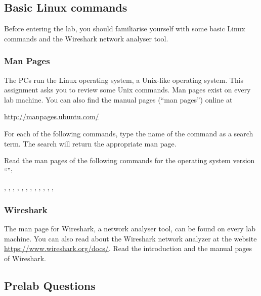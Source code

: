 \subsection*{Basic Linux commands}
Before entering the lab, you should familiarise yourself with some basic Linux commands and the Wireshark network analyser tool.

\subsubsection*{Man Pages}
The PCs run the Linux operating system, a Unix-like operating system. This assignment asks you to review some Unix commands. Man pages exist on every lab machine. You can also find the manual pages (``man pages'') online at

\qquad \url{http://manpages.ubuntu.com/}

For each of the following commands, type the name of the command as a search term. The search will return the appropriate man page.

Read the man pages of the following commands for the operating system version ``\osversion'':

\qquad {}, , , , , , , , , , , , 

\subsubsection*{Wireshark}
The man page for Wireshark, a network analyser tool, can be found on every lab machine. You can also read about the Wireshark network analyzer at the website
\url{https://www.wireshark.org/docs/}.
Read the introduction and the manual pages of Wireshark.

\newpage
\subsection*{Prelab Questions}

\begin{questions}
\end{questions}
